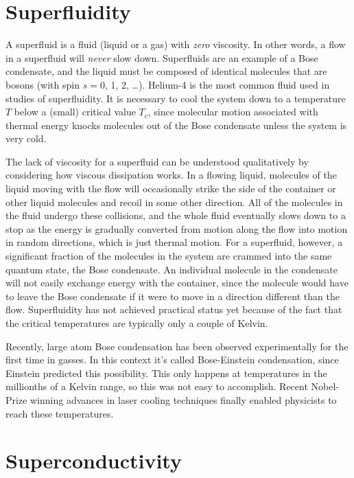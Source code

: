 \section{Superfluidity}
\label{sec:superfluidity}

A superfluid is a fluid (liquid or a gas) with {\em zero} viscosity.
In other words, a flow in a superfluid will {\em never} slow down.
Superfluids are an example of a Bose condensate, and the liquid must
be composed of identical molecules that are bosons (with spin $s = 0$,
1, 2, \dots).  Helium-4 is the most common fluid used in studies of
superfluidity.  It is necessary to cool the system down to a
temperature $T$ below a (small) critical value $T_c$, since molecular
motion associated with thermal energy knocks molecules out of the Bose
condensate unless the system is very cold.

The lack of viscosity for a superfluid can be understood qualitatively
by considering how viscous dissipation works.  In a flowing liquid,
molecules of the liquid moving with the flow will occasionally strike
the side of the container or other liquid molecules and recoil in some
other direction.  All of the molecules in the fluid undergo these
collisions, and the whole fluid eventually slows down to a stop as the
energy is gradually converted from motion along the flow into motion
in random directions, which is just thermal motion.  For a superfluid,
however, a significant fraction of the molecules in the system are
crammed into the same quantum state, the Bose condensate.  An
individual molecule in the condensate will not easily exchange energy
with the container, since the molecule would have to leave the Bose
condensate if it were to move in a direction different than the flow.
Superfluidity has not achieved practical status yet because of the
fact that the critical temperatures are typically only a couple of
Kelvin.

Recently, large atom Bose condensation has been observed
experimentally for the first time in gasses.  In this context it's
called Bose-Einstein condensation, since Einstein predicted this
possibility.  This only happens at temperatures in the millionths of a
Kelvin range, so this was not easy to accomplish.  Recent Nobel-Prize
winning advances in laser cooling techniques finally enabled
physicists to reach these temperatures.


\section{Superconductivity}
\label{sec:superconductivity}

